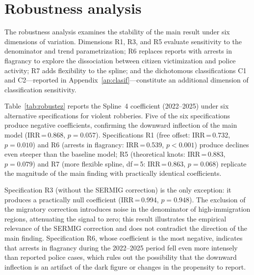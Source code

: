 \documentclass[pdflatex,sn-basic]{sn-jnl}
\begin{document}
\section{Robustness analysis}
\label{sec:robustez}

The robustness analysis examines the stability of the main result under six dimensions of
variation. Dimensions R1, R3, and R5 evaluate sensitivity to the denominator and trend
parametrization; R6 replaces reports with arrests in flagrancy to explore the dissociation
between citizen victimization and police activity; R7 adds flexibility to the spline;
and the dichotomous classifications C1 and C2---reported in Appendix~\ref{ap:clasif}---constitute an additional dimension of classification sensitivity.

Table~\ref{tab:robustez} reports the Spline~4 coefficient (2022--2025) under six
alternative specifications for violent robberies. Five of the six specifications
produce negative coefficients, confirming the downward inflection of the main
model (IRR\,=\,0.868, $p=0.057$). Specifications R1 (free offset:
IRR\,=\,0.732, $p=0.010$) and R6 (arrests in flagrancy: IRR\,=\,0.539, $p<0.001$)
produce declines even steeper than the baseline model; R5 (theoretical knots:
IRR\,=\,0.883, $p=0.079$) and R7 (more flexible spline, df\,=\,5: IRR\,=\,0.863,
$p=0.068$) replicate the magnitude of the main finding with practically identical coefficients.

Specification R3 (without the SERMIG correction) is the only exception:
it produces a practically null coefficient (IRR\,=\,0.994, $p=0.948$). The exclusion
of the migratory correction introduces noise in the denominator of high-immigration
regions, attenuating the signal to zero; this result illustrates the
empirical relevance of the SERMIG correction and does not contradict the direction
of the main finding. Specification R6, whose coefficient is the most negative,
indicates that arrests in flagrancy during the 2022--2025 period fell even
more intensely than reported police cases, which rules out the possibility that the
downward inflection is an artifact of the dark figure or changes in the propensity
to report.
\end{document}
